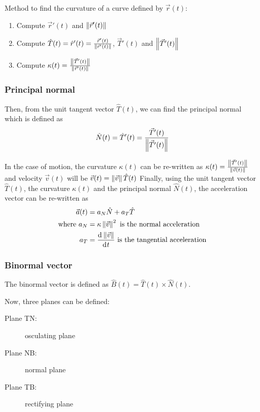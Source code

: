 \documentclass[10pt, twocolumn]{article}
\theoremstyle{remark}
\begin{document}
Method to find the curvature of a curve defined by \(\vec{r}(t)\):
\begin{enumerate}
  \item Compute \(\vec{r}'(t)\) and \(\left\| \vec{r}'(t) \right\|\)
  \item Compute \(\hat{T}(t) = \hat{r}'(t) = \frac{\vec{r}'(t)}{\left\| \vec{r}'(t) \right\|}\), \(\vec{T}'(t)\) and \(\left\| \vec{T}'(t) \right\|\)
  \item Compute \(\kappa(t) = \frac{\left\| \vec{T}'(t) \right\|}{\left\| \vec{r}'(t) \right\|}\)
\end{enumerate}

\subsubsection*{Principal normal}
Then, from the unit tangent vector \(\hat{T}(t)\), we can find the principal normal which is defined as
\[
  \hat{N}(t) = \hat{T}'(t) = \frac{\vec{T}'(t)}{\left\| \vec{T}'(t) \right\|}
\]

In the case of motion, the curvature \(\kappa(t)\) can be re-written as \(\kappa(t) = \frac{\left\| \vec{T}'(t) \right\|}{\left\| \vec{v}(t) \right\|}\) and velocity \(\vec{v}(t)\) will be \(\vec{v}(t) = \left\| \vec{v} \right\|\hat{T}(t)\)
Finally, using the unit tangent vector \(\hat{T}(t)\), the curvature \(\kappa(t)\) and the principal normal \(\hat{N}(t)\), the acceleration vector can be re-written as
\begin{align*}
  \vec{a}(t)        & = a_N \hat{N} + a_T \hat{T}                                          \\
  \text{where } a_N & = \kappa \left\| \vec{v} \right\|^2 \text{ is the normal acceleration}            \\
  a_T               & = \frac{\mathrm{d}^{} \left\| \vec{v} \right\|}{\mathrm{d}^{} t} \text{ is the tangential acceleration}
\end{align*}

\subsubsection*{Binormal vector}
The binormal vector is defined as \(\hat{B}(t) = \hat{T}(t) \times  \hat{N}(t)\).

Now, three planes can be defined:
\begin{description}
  \item[Plane TN:] osculating plane
  \item[Plane NB:] normal plane
  \item[Plane TB:] rectifying plane
\end{description}
\end{document}
